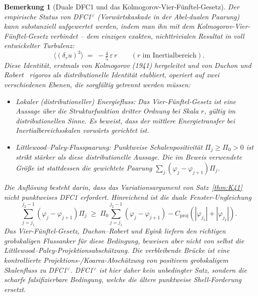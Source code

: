 \documentclass[12pt,a4paper]{article}
\theoremstyle{breakdef}
\theoremstyle{breakplain}
\theoremstyle{breakdef}
\newtheorem{remark}[definition]{Bemerkung}
\begin{document}
\begin{remark}[Duale DFC1 und das Kolmogorov-Vier-Fünftel-Gesetz]
\label{rem:dfc1-four-fifths}
Der empirische Status von DFC1$^\vee$ (Vorwärtskaskade in der
Abel-dualen Paarung) kann substanziell aufgewertet werden, indem man ihn
mit dem Kolmogorov-Vier-Fünftel-Gesetz verbindet -- dem einzigen exakten,
nichttrivialen Resultat in voll entwickelter Turbulenz:
\[
\langle (\delta_r u)^3 \rangle \;=\; -\tfrac{4}{5}\,\varepsilon\, r \qquad (r \text{ im Inertialbereich}).
\]
Diese Identität, erstmals von Kolmogorov (1941) hergeleitet und von
Duchon und Robert~\cite{DR00} rigoros als distributionelle Identität
etabliert, operiert auf zwei verschiedenen Ebenen, die sorgfältig
getrennt werden müssen:
\begin{itemize}
\item \emph{Lokaler (distributioneller) Energiefluss:} Das
Vier-Fünftel-Gesetz ist eine Aussage über die Strukturfunktion dritter
Ordnung bei Skala $r$, gültig im distributionellen Sinne. Es beweist,
dass der \emph{mittlere} Energietransfer bei Inertialbereichsskalen
vorwärts gerichtet ist.
\item \emph{Littlewood--Paley-Flusspaarung:} Punktweise
Schalenpositivität $\Pi_j \geq \Pi_0>0$ ist strikt stärker als diese
distributionelle Aussage. Die im Beweis verwendete Größe ist stattdessen
die gewichtete Paarung $\sum_j(\varphi_j-\varphi_{j+1})\Pi_j$.
\end{itemize}
Die Auflösung besteht darin, dass das Variationsargument von
Satz~\ref{thm:K41} \emph{nicht} punktweises DFC1 erfordert. Hinreichend
ist die duale Fenster-Ungleichung
\[
\sum_{j=j_1}^{j_2-1}(\varphi_j-\varphi_{j+1})\Pi_j
\;\ge\;
\Pi_0\sum_{j=j_1}^{j_2-1}(\varphi_j-\varphi_{j+1})
- C_{\mathrm{proj}}(|\varphi_{j_1}|+|\varphi_{j_2}|).
\]
Das Vier-Fünftel-Gesetz, Duchon--Robert und Eyink liefern den richtigen
grobskaligen Flussanker für diese Bedingung, beweisen aber nicht von
selbst die Littlewood--Paley-Projektionsabschätzung. Die verbleibende
Brücke ist eine kontrollierte Projektions-/Koarea-Abschätzung von positivem
grobskaligem Skalenfluss zu DFC1$^\vee$. DFC1$^\vee$ ist hier daher kein
unbedingter Satz, sondern die scharfe falsifizierbare Bedingung, welche
die ältere punktweise Shell-Forderung ersetzt.
\end{remark}
\end{document}
